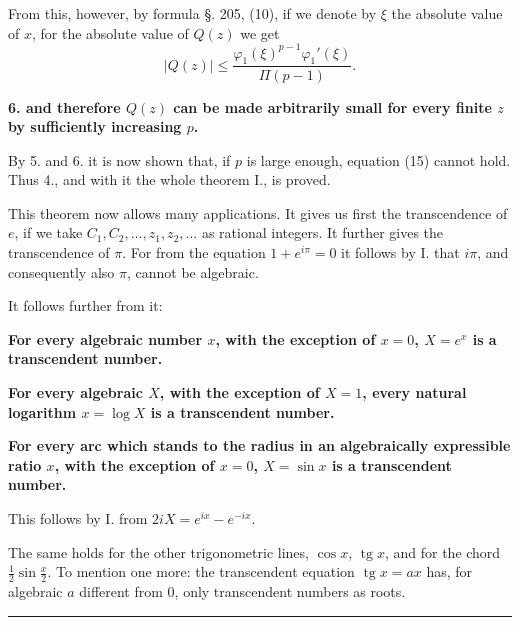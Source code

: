 \documentclass[11pt]{article}
\newcommand{\abs}[1]{\left|#1\right|}
\DeclareMathOperator{\tg}{tg}
\newcommand{\tg}{\operatorname{tg}}
\begin{document}
From this, however, by formula §. 205, (10), if we denote by $\xi$ the absolute value of $x$, for the absolute value of $Q(z)$ we get
\[
\abs{Q(z)}\leq \frac{\varphi_1(\xi)^{p-1}\varphi_1'(\xi)}{\Pi(p-1)}.
\]

\textbf{6. and therefore $Q(z)$ can be made arbitrarily small for every finite $z$ by sufficiently increasing $p$.}

By 5. and 6. it is now shown that, if $p$ is large enough, equation (15) cannot hold. Thus 4., and with it the whole theorem I., is proved.

This theorem now allows many applications. It gives us first the transcendence of $e$, if we take $C_1,C_2,\ldots,z_1,z_2,\ldots$ as rational integers. It further gives the transcendence of $\pi$. For from the equation $1+e^{i\pi}=0$ it follows by I. that $i\pi$, and consequently also $\pi$, cannot be algebraic.

It follows further from it:

\begin{center}
\textbf{For every algebraic number $x$, with the exception of $x=0$, $X=e^x$ is a transcendent number.}

\textbf{For every algebraic $X$, with the exception of $X=1$, every natural logarithm $x=\log X$ is a transcendent number.}

\textbf{For every arc which stands to the radius in an algebraically expressible ratio $x$, with the exception of $x=0$, $X=\sin x$ is a transcendent number.}
\end{center}

This follows by I. from $2iX=e^{ix}-e^{-ix}$.

The same holds for the other trigonometric lines, $\cos x$, $\tg x$, and for the chord $\frac12\sin\frac{x}{2}$. To mention one more: the transcendent equation $\tg x=ax$ has, for algebraic $a$ different from 0, only transcendent numbers as roots.

\bigskip
\begin{center}\rule{0.28\linewidth}{0.4pt}\end{center}
\end{document}
